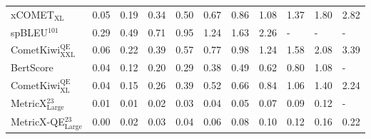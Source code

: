 \begin{tabular}{lllllllllll}
xCOMET$_\textrm{XL}$                    &                                        0.05 &     0.19 &     0.34 &     0.50 &     0.67 &     0.86 &     1.08 &     1.37 &     1.80 &     2.82 \\
spBLEU$^\textrm{101}$                   &                                        0.29 &     0.49 &     0.71 &     0.95 &     1.24 &     1.63 &     2.26 &        - &        - &        - \\
CometKiwi$_\textrm{XXL}^\textrm{QE}$    &                                        0.06 &     0.22 &     0.39 &     0.57 &     0.77 &     0.98 &     1.24 &     1.58 &     2.08 &     3.39 \\
BertScore                               &                                        0.04 &     0.12 &     0.20 &     0.29 &     0.38 &     0.49 &     0.62 &     0.80 &     1.08 &        - \\
CometKiwi$_\textrm{XL}^\textrm{QE}$     &                                        0.04 &     0.15 &     0.26 &     0.39 &     0.52 &     0.66 &     0.84 &     1.06 &     1.40 &     2.24 \\
MetricX$_\textrm{Large}^\textrm{23}$    &                                        0.01 &     0.01 &     0.02 &     0.03 &     0.04 &     0.05 &     0.07 &     0.09 &     0.12 &        - \\
MetricX-QE$_\textrm{Large}^\textrm{23}$ &                                        0.00 &     0.02 &     0.03 &     0.04 &     0.06 &     0.08 &     0.10 &     0.12 &     0.16 &     0.22 \\
\bottomrule
\end{tabular}
